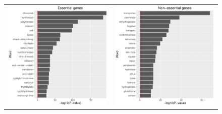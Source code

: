 \documentclass[12pt,letterpaper]{article}
\begin{document}
\begin{figure}
\centering
\begin{tabular}{c c}
\includegraphics[scale=0.4]{essential-pval.pdf}&
\includegraphics[scale=0.4]{non-essential-pval.pdf}\\

\end{tabular}
\end{figure}
\end{document}
